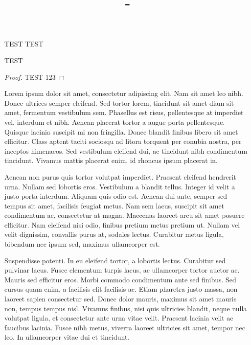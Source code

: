 \documentclass{article}
\author{\MyAuthor{}}
\title{\MyClass{} \-- \MyTitle{}}
\begin{document}
\maketitle

\begin{theorem}
    TEST TEST
\end{theorem}

\begin{definition}
    TEST
\end{definition}

\begin{proof}
    TEST 123
\end{proof}
Lorem ipsum dolor sit amet, consectetur adipiscing elit. Nam sit amet leo nibh. Donec ultrices semper eleifend. Sed tortor lorem, tincidunt sit amet diam sit amet, fermentum vestibulum sem. Phasellus est risus, pellentesque at imperdiet vel, interdum et nibh. Aenean placerat tortor a augue porta pellentesque. Quisque lacinia suscipit mi non fringilla. Donec blandit finibus libero sit amet efficitur. Class aptent taciti sociosqu ad litora torquent per conubia nostra, per inceptos himenaeos. Sed vestibulum eleifend dui, ac tincidunt nibh condimentum tincidunt. Vivamus mattis placerat enim, id rhoncus ipsum placerat in.

Aenean non purus quis tortor volutpat imperdiet. Praesent eleifend hendrerit urna. Nullam sed lobortis eros. Vestibulum a blandit tellus. Integer id velit a justo porta interdum. Aliquam quis odio est. Aenean dui ante, semper sed tempus sit amet, facilisis feugiat metus. Nam sem lacus, suscipit sit amet condimentum ac, consectetur at magna. Maecenas laoreet arcu sit amet posuere efficitur. Nam eleifend nisi odio, finibus pretium metus pretium ut. Nullam vel velit dignissim, convallis purus at, sodales lectus. Curabitur metus ligula, bibendum nec ipsum sed, maximus ullamcorper est.

Suspendisse potenti. In eu eleifend tortor, a lobortis lectus. Curabitur sed pulvinar lacus. Fusce elementum turpis lacus, ac ullamcorper tortor auctor ac. Mauris sed efficitur eros. Morbi commodo condimentum ante sed finibus. Sed cursus quam enim, a facilisis elit facilisis ac. Etiam pharetra justo massa, non laoreet sapien consectetur sed. Donec dolor mauris, maximus sit amet mauris non, tempus tempus nisl. Vivamus finibus, nisi quis ultricies blandit, neque nulla volutpat ligula, et consectetur ante urna vitae velit. Praesent lacinia velit ac faucibus lacinia. Fusce nibh metus, viverra laoreet ultricies sit amet, tempor nec leo. In ullamcorper vitae dui et tincidunt.
\end{document}

